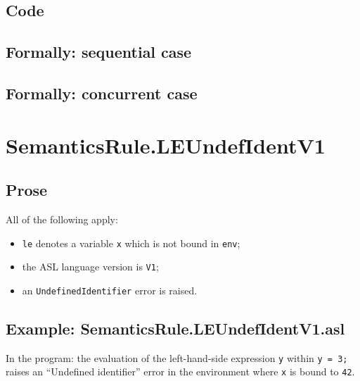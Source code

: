 \documentclass{book}
\begin{document}
  \subsection{Code}

\begin{emptyformal}
  \subsection{Formally: sequential case}

  \subsection{Formally: concurrent case}
\end{emptyformal}


\section{SemanticsRule.LEUndefIdentV1 \label{sec:SemanticsRule.LEUndefIdentV1}}

    \subsection{Prose}
    All of the following apply:
    \begin{itemize}
    \item \texttt{le} denotes a variable \texttt{x} which is not bound in \texttt{env};
    \item the ASL language version is \texttt{V1};
    \item an \texttt{UndefinedIdentifier} error is raised.
    \end{itemize}

    \subsection{Example: SemanticsRule.LEUndefIdentV1.asl}
    In the program:
    the evaluation of the left-hand-side expression \texttt{y} within \texttt{y
= 3;} raises an ``Undefined identifier'' error in the environment where
\texttt{x} is bound to \texttt{42}.
\end{document}
